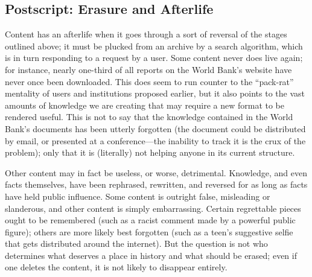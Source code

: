\subsection{Postscript: Erasure and Afterlife}

Content has an afterlife when it goes through a sort of reversal of the stages outlined above; it must be plucked from an archive by a search algorithm, which is in turn responding to a request by a user. Some content never does live again; for instance, nearly one-third of all reports on the World Bank’s website have never once been downloaded.  This does seem to run counter to the “pack-rat” mentality of users and institutions proposed earlier, but it also points to the vast amounts of knowledge we are creating that may require a new format to be rendered useful. This is not to say that the knowledge contained in the World Bank’s documents has been utterly forgotten (the document could be distributed by email, or presented at a conference—the inability to track it is the crux of the problem); only that it is (literally) not helping anyone in its current structure.

Other content may in fact be useless, or worse, detrimental. Knowledge, and even facts themselves, have been rephrased, rewritten, and reversed for as long as facts have held public influence.  Some content is outright false, misleading or slanderous, and other content is simply embarrassing. Certain regrettable pieces ought to be remembered (such as a racist comment made by a powerful public figure); others are more likely best forgotten (such as a teen’s suggestive selfie that gets distributed around the internet). But the question is not who determines what deserves a place in history and what should be erased; even if one deletes the content, it is not likely to disappear entirely.

